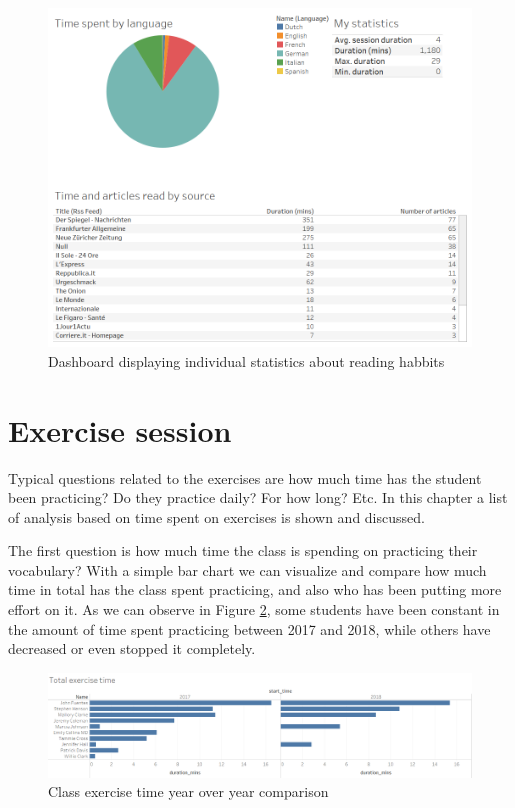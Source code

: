 \begin{figure}[!htb]
	\centering
	\includegraphics[width=1\linewidth]{gfx/Personal_dashboard}
	\caption{Dashboard displaying individual statistics about reading habbits}
	\label{fig:Personal_dashboard}
\end{figure}



\section{Exercise session}
Typical questions related to the exercises are how much time has the student been practicing? Do they practice daily? For how long? Etc. In this chapter a list of analysis based on time spent on exercises is shown and discussed.

The first question is how much time the class is spending on practicing their vocabulary? With a simple bar chart we can visualize and compare how much time in total has the class spent practicing, and also who has been putting more effort on it. As we can observe in Figure \ref{fig:Total_exercise_time}, some students have been constant in the amount of time spent practicing between 2017 and 2018, while others have decreased or even stopped it completely.

\begin{figure}[bth]
	\centering
	\includegraphics[width=1\linewidth]{gfx/Total_exercise_time}
	\caption{Class exercise time year over year comparison}
	\label{fig:Total_exercise_time}
\end{figure}

